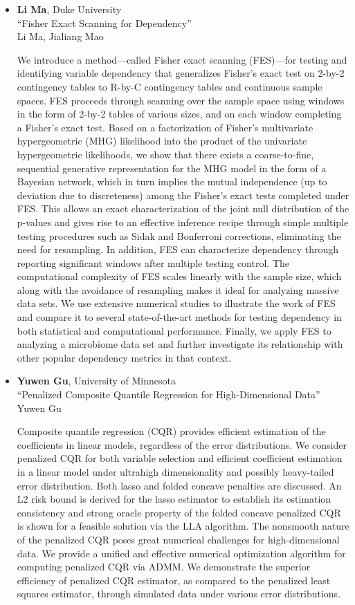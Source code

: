 \begin{itemize}
\item \textbf{Li Ma}, Duke University \\
``Fisher Exact Scanning for Dependency'' \\
Li Ma, Jialiang Mao


We introduce a method—called Fisher exact scanning (FES)—for testing and identifying variable dependency that generalizes Fisher’s exact test on 2-by-2 contingency tables to R-by-C contingency tables and continuous sample spaces. FES proceeds through scanning over the sample space using windows in the form of 2-by-2 tables of various sizes, and on each window completing a Fisher’s exact test. Based on a factorization of Fisher’s multivariate hypergeometric (MHG) likelihood into the product of the univariate hypergeometric likelihoods, we show that there exists a coarse-to-fine, sequential generative representation for the MHG model in the form of a Bayesian network, which in turn implies the mutual independence (up to deviation due to discreteness) among the Fisher’s exact tests completed under FES. This allows an exact characterization of the joint null distribution of the p-values and gives rise to an effective inference recipe through simple multiple testing procedures such as Sidak and Bonferroni corrections, eliminating the need for resampling. In addition, FES can characterize dependency through reporting significant windows after multiple testing control. The computational complexity of FES scales linearly with the sample size, which along with the avoidance of resampling makes it ideal for analyzing massive data sets. We use extensive numerical studies to illustrate the work of FES and compare it to several state-of-the-art methods for testing dependency in both statistical and computational performance. Finally, we apply FES to analyzing a microbiome data set and further investigate its relationship with other popular dependency metrics in that context.

\item \textbf{Yuwen Gu}, University of Minnesota \\
``Penalized Composite Quantile Regression for High-Dimensional Data'' \\
Yuwen Gu


Composite quantile regression (CQR) provides efficient estimation of the coefficients in linear models, regardless of the error distributions. We consider penalized CQR for both variable selection and efficient coefficient estimation in a linear model under ultrahigh dimensionality and possibly heavy-tailed error distribution. Both lasso and folded concave penalties are discussed. An L2 risk bound is derived for the lasso estimator to establish its estimation consistency and strong oracle property of the folded concave penalized CQR is shown for a feasible solution via the LLA algorithm. The nonsmooth nature of the penalized CQR poses great numerical challenges for high-dimensional data. We provide a unified and effective numerical optimization algorithm for computing penalized CQR via ADMM. We demonstrate the superior efficiency of penalized CQR estimator, as compared to the penalized least squares estimator, through simulated data under various error distributions. 


\end{itemize}
